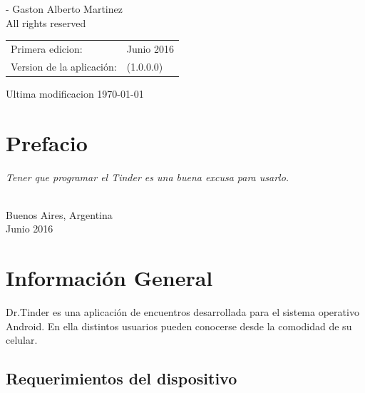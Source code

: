 \documentclass[10pt,letterpaper,extrafontsizes]{memoir}
\begin{document}
\begingroup
\footnotesize
\setlength{\parindent}{0pt}
\setlength{\parskip}{\baselineskip}
\textcopyright{} \the \year - Gaston Alberto Martinez\\
All rights reserved

\begin{center}
\begin{tabular}{ll}
Primera edicion:                        & Junio 2016 \\
Version de la aplicación: & (1.0.0.0)
\end{tabular}
\end{center}

Ultima modificacion \today


\endgroup

\clearpage
\vspace*{\fill}

\pagestyle{headings}

\tableofcontents
\vspace*{\fill}
\clearpage
\listoffigures
\clearpage
\listoftables
\clearpage

\chapter{Prefacio}

    \textit{Tener que programar el Tinder es una buena excusa para usarlo.}\\

{ \\ Buenos Aires, Argentina\\ Junio 2016\par}

\mainmatter

\chapter{Información General} \label{chap:infogeneral}

Dr.Tinder es una aplicación de encuentros desarrollada para el sistema operativo Android. En ella distintos usuarios pueden conocerse desde la comodidad de su celular.

\newpage
\section{Requerimientos del dispositivo}
\end{document}
